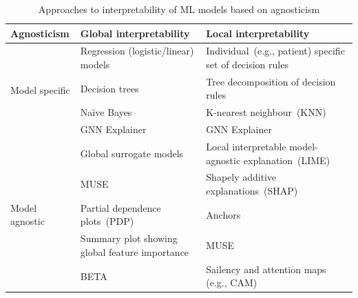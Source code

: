 \begin{table}[h]
    \centering
    \scriptsize
    \caption{Approaches to interpretability of ML models based on agnosticism}
    \label{tab:global_vs_lical_xai}
    \vspace{-2mm}
    \begin{tabular}{l|l|l} 
        \hline
        \textbf{Agnosticism}  & \textbf{Global interpretability}  & \textbf{Local interpretability} \\ 
        \hline
        \multirow{4}{*}{Model specific} & Regression (logistic/linear) models & Individual~(e.g., patient) specific set of decision rules \\ 
        \cline{2-3}
        & Decision trees & Tree decomposition of decision rules \\ 
        \cline{2-3}
        & Naïve Bayes & K-nearest neighbour~(KNN)\\ 
        \cline{2-3}
        & GNN Explainer~\cite{GNNEXPLAINER} & GNN Explainer~\cite{GNNEXPLAINER} \\ 
        \hline
        \multirow{5}{*}{Model agnostic} & Global surrogate models  & Local interpretable model-agnostic explanation~(LIME)~\cite{LIME}\\ 
        \cline{2-3}
        &  MUSE  & Shapely additive explanations~(SHAP)~\cite{SHAP}\\ 
        \cline{2-3}
        & Partial dependence plots~(PDP) & Anchors~\cite{ribeiro2018anchors} \\ 
        \cline{2-3}
        & Summary plot showing global feature importance & MUSE \\ 
        \cline{2-3}
        & BETA~\cite{BETA} & Sailency and attention maps (e.g., CAM)\\ 
        \hline
    \end{tabular}
    \vspace{-4mm}
\end{table}

